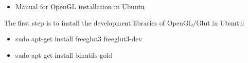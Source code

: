 


\usepackage[pdfauthor={Name}, pdftitle={Weekly}, pdfsubject={Week 1}, pdfkeywords={},colorlinks=true,urlcolor=black,linkcolor=black, citecolor=black]{hyperref}
\usepackage{listings}
\usepackage{subfig}
\usepackage{graphicx}




\renewcommand{\labelitemi}{\textcolor{main}{\small $\blacktriangleright$}}
\renewcommand{\labelitemii}{\textcolor{second}{\scriptsize \textbullet}}


\begin{enbref}
\begin{itemize}
\item Manual for OpenGL installation in Ubuntu\\
\end{itemize}
\medskip

\end{enbref}



The first step is to install the development libraries of OpenGL/Glut in Ubuntu:

\begin{itemize}
\item sudo apt-get install freeglut3 freeglut3-dev\\
\item sudo apt-get install binutils-gold\\
\end{itemize}


